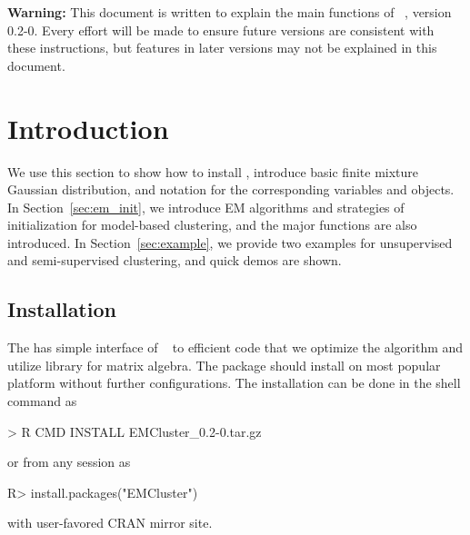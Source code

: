 
{\color{red} \bf Warning:} This document is written to explain the main
functions of ~\citep{Chen2012EMClusterpackage}, version 0.2-0.
Every effort will be made to ensure future versions are consistent with
these instructions, but features in later versions may not be explained
in this document.


\section[Introduction]{Introduction}
\label{sec:introduction}

We use this section to show how to install ,
introduce basic finite mixture Gaussian distribution,
and notation for the corresponding variables and objects.
In Section~\ref{sec:em_init}, we introduce EM algorithms and
strategies of initialization for model-based clustering, and
the major  functions are also introduced.
In Section~\ref{sec:example}, we provide two
examples for unsupervised and semi-supervised clustering,
and quick demos are shown.


\subsection[Installation]{Installation}
The  has simple interface of ~\citep{Rcore}
to efficient  code that we optimize the algorithm and
utilize  library for matrix algebra. The package should install
on most popular platform without further configurations. The installation
can be done in the shell command as
\begin{Command}
> R CMD INSTALL EMCluster_0.2-0.tar.gz
\end{Command}
or from any  session as
\begin{Command}
R> install.packages("EMCluster") 
\end{Command}
with user-favored CRAN mirror site.


